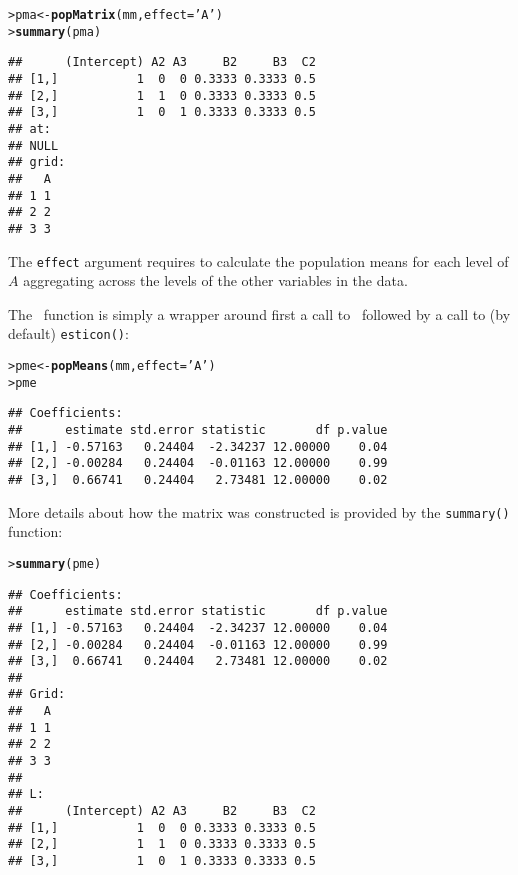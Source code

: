 \documentclass[11pt]{article}\usepackage[]{graphicx}\usepackage[]{color}
\makeatletter
\newcommand{\hlstr}[1]{\textcolor[rgb]{0.192,0.494,0.8}{#1}}%
\newcommand{\hlstd}[1]{\textcolor[rgb]{0.345,0.345,0.345}{#1}}%
\newcommand{\hlkwb}[1]{\textcolor[rgb]{0.69,0.353,0.396}{#1}}%
\newcommand{\hlkwc}[1]{\textcolor[rgb]{0.333,0.667,0.333}{#1}}%
\newcommand{\hlkwd}[1]{\textcolor[rgb]{0.737,0.353,0.396}{\textbf{#1}}}%
\newenvironment{kframe}{%
 \def\at@end@of@kframe{}%
 \ifinner\ifhmode%
  \def\at@end@of@kframe{\end{minipage}}%
  \begin{minipage}{\columnwidth}%
 \fi\fi%
 \def\FrameCommand##1{\hskip\@totalleftmargin \hskip-\fboxsep
 \colorbox{shadecolor}{##1}\hskip-\fboxsep
     \hskip-\linewidth \hskip-\@totalleftmargin \hskip\columnwidth}%
 \MakeFramed {\advance\hsize-\width
   \@totalleftmargin\z@ \linewidth\hsize
   \@setminipage}}%
 {\par\unskip\endMakeFramed%
 \at@end@of@kframe}
\newenvironment{knitrout}{}{} %
\def\code#1{\texttt{#1}}
\def\esticon{\code{esticon()}}
\renewenvironment{knitrout}{
  \begin{oldknitrout}
    \footnotesize
    \topsep=0pt
}{
  \end{oldknitrout}
}
\makeatother
\begin{document}
\begin{knitrout}
\color{fgcolor}\begin{kframe}
\begin{alltt}
\hlstd{> }\hlstd{pma} \hlkwb{<-} \hlkwd{popMatrix}\hlstd{(mm,}\hlkwc{effect}\hlstd{=}\hlstr{'A'}\hlstd{)}
\hlstd{> }\hlkwd{summary}\hlstd{(pma)}
\end{alltt}
\begin{verbatim}
##      (Intercept) A2 A3     B2     B3  C2
## [1,]           1  0  0 0.3333 0.3333 0.5
## [2,]           1  1  0 0.3333 0.3333 0.5
## [3,]           1  0  1 0.3333 0.3333 0.5
## at: 
## NULL
## grid: 
##   A
## 1 1
## 2 2
## 3 3
\end{verbatim}
\end{kframe}
\end{knitrout}

The \verb+effect+ argument requires  to calculate the population means
for each level of
$A$ aggregating across the levels of the other variables in the data.

The \popmeans\ function is simply a wrapper around first a call
to \popmatrix\ followed by a call to (by default) \esticon:

\begin{knitrout}
\color{fgcolor}\begin{kframe}
\begin{alltt}
\hlstd{> }\hlstd{pme} \hlkwb{<-} \hlkwd{popMeans}\hlstd{(mm,} \hlkwc{effect}\hlstd{=}\hlstr{'A'}\hlstd{)}
\hlstd{> }\hlstd{pme}
\end{alltt}
\begin{verbatim}
## Coefficients:
##      estimate std.error statistic       df p.value
## [1,] -0.57163   0.24404  -2.34237 12.00000    0.04
## [2,] -0.00284   0.24404  -0.01163 12.00000    0.99
## [3,]  0.66741   0.24404   2.73481 12.00000    0.02
\end{verbatim}
\end{kframe}
\end{knitrout}

More details about how the matrix was constructed is provided by the
\code{summary()} function:

\begin{knitrout}
\color{fgcolor}\begin{kframe}
\begin{alltt}
\hlstd{> }\hlkwd{summary}\hlstd{(pme)}
\end{alltt}
\begin{verbatim}
## Coefficients:
##      estimate std.error statistic       df p.value
## [1,] -0.57163   0.24404  -2.34237 12.00000    0.04
## [2,] -0.00284   0.24404  -0.01163 12.00000    0.99
## [3,]  0.66741   0.24404   2.73481 12.00000    0.02
## 
## Grid:
##   A
## 1 1
## 2 2
## 3 3
## 
## L:
##      (Intercept) A2 A3     B2     B3  C2
## [1,]           1  0  0 0.3333 0.3333 0.5
## [2,]           1  1  0 0.3333 0.3333 0.5
## [3,]           1  0  1 0.3333 0.3333 0.5
\end{verbatim}
\end{kframe}
\end{knitrout}
\end{document}
